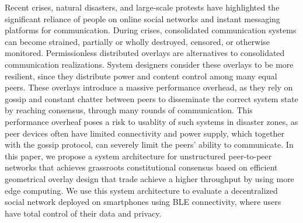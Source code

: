 Recent crises, natural disasters, and large-scale protests have highlighted the significant reliance of people on online social networks and instant messaging platforms for communication.
During crises, consolidated communication systems can become strained, partially or wholly destroyed, censored, or otherwise monitored.
Permissionless distributed overlays are alternatives to consolidated communication realizations.
System designers consider these overlays to be more resilient, since they distribute power and content control among many equal peers.
These overlays introduce a massive performance overhead, as they rely on gossip and constant chatter between peers to disseminate the correct system state by reaching consensus, through many rounds of communication.
This performance overheaf poses a risk to usablity of such systems in disaster zones, as peer devices often have limited connectivity and power supply, which together with the gossip protocol, can severely limit the peers' ability to communicate.
In this paper, we propose a system architecture for unstructured peer-to-peer networks that achieves grassroots constitutional consensus based on efficient geometrical overlay design that trade achieve a higher throughput by using more edge computing.
We use this system architecture to evaluate a decentralized social network deployed on smartphones using BLE connectivity, where users have total control of their data and privacy.